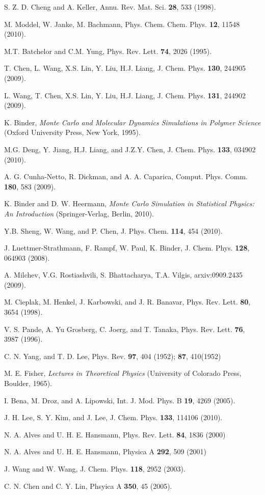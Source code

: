 \documentclass[aps,pre,twocolumn,showpacs,preprintnumbers,amsmath,amssymb]{revtex4-1}
\begin{document}
\begin{thebibliography}{10}
S. Z. D. Cheng and A. Keller, Annu. Rev. Mat. Sci. {\bf 28}, 533 (1998).



M. Moddel, W. Janke, M. Bachmann, Phys. Chem. Chem. Phys. {\bf 12},
11548 (2010).

M.T. Batchelor and C.M. Yung, Phys. Rev. Lett. {\bf 74}, 2026 (1995).

T. Chen, L. Wang, X.S. Lin, Y. Liu, H.J. Liang, J. Chem. Phys.
{\bf 130}, 244905 (2009).

L. Wang, T. Chen, X.S. Lin, Y. Liu, H.J. Liang, J. Chem. Phys.
{\bf 131}, 244902 (2009).

K. Binder, {\it Monte Carlo and Molecular Dynamics Simulations in
Polymer Science} (Oxford University Press, New York, 1995).

M.G. Deng, Y. Jiang, H.J. Liang, and J.Z.Y. Chen, J. Chem. Phys.
{\bf 133}, 034902 (2010).

A. G. Cunha-Netto, R. Dickman, and A. A. Caparica, Comput. Phys. Comm.
{\bf 180}, 583 (2009).

K. Binder and D. W. Heermann, {\it Monte Carlo Simulation in
Statistical Physics: An Introduction} (Springer-Verlag, Berlin, 2010).

Y.B. Sheng, W. Wang, and P. Chen, J. Phys. Chem. {\bf 114},
454 (2010).

J. Luettmer-Strathmann, F. Rampf, W. Paul, K. Binder, J. Chem. Phys.
{\bf 128}, 064903 (2008).

A. Milchev, V.G. Rostiashvili, S. Bhattacharya, T.A. Vilgis,
arxiv:0909.2435 (2009).

M. Cieplak, M. Henkel, J. Karbowski, and J. R. Banavar,
Phys. Rev. Lett. {\bf 80}, 3654 (1998).

V. S. Pande, A. Yu Grosberg, C. Joerg, and T. Tanaka,
Phys. Rev. Lett. {\bf 76}, 3987 (1996).

C. N. Yang, and T. D. Lee, Phys. Rev. {\bf 97}, 404 (1952);
{\bf 87}, 410(1952)

M. E. Fisher, {\it Lectures in Theoretical Physics} (University of Colorado
Press, Boulder, 1965).

I. Bena, M. Droz, and A. Lipowski, Int. J. Mod. Phys. B {\bf 19},
4269 (2005).

J. H. Lee, S. Y. Kim, and J. Lee, J. Chem. Phys. {\bf 133}, 114106 (2010).

N. A. Alves and U. H. E. Hansmann, Phys. Rev. Lett. {\bf 84}, 1836 (2000)

N. A. Alves and U. H. E. Hansmann, Physica A {\bf 292}, 509 (2001)

J. Wang and W. Wang, J. Chem. Phys. {\bf 118}, 2952 (2003).

C. N. Chen and C. Y. Lin, Phsyica A {\bf 350}, 45 (2005).

\end{thebibliography}
\end{document}
